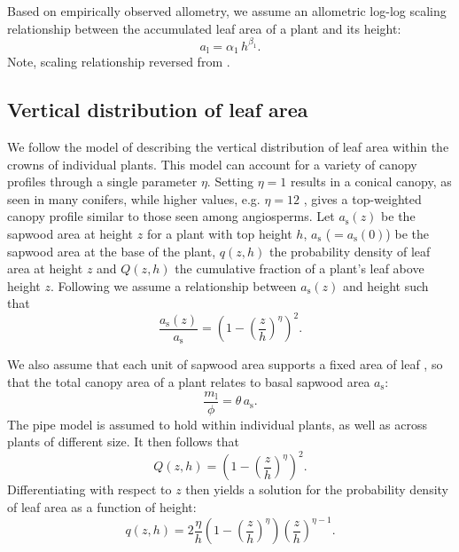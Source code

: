 \documentclass[10pt,twoside]{article}
\begin{document}
Based on empirically observed allometry, we assume an allometric log-log
scaling relationship between the accumulated leaf area of a plant and
its height:
\begin{equation}\label{eq:ha}
a_\textrm{l}=\alpha_1 \, h^{\beta_1}.
\end{equation}
Note, scaling relationship reversed from \citep{Falster-2011}.

\subsection{Vertical distribution of leaf
area}\label{vertical-distribution-of-leaf-area}

We follow the model of \citet{Yokozawa-1995} describing the vertical
distribution of leaf area within the crowns of individual plants. This
model can account for a variety of canopy profiles through a single
parameter \(\eta\). Setting \(\eta=1\) results in a conical canopy, as
seen in many conifers, while higher values, e.g. \(\eta=12\) , gives a
top-weighted canopy profile similar to those seen among angiosperms. Let
\(a_\textrm{s}(z)\) be the sapwood area at height \(z\) for a plant with
top height \(h\), \(a_\textrm{s}\) ($= a_\textrm{s}(0)$) be the sapwood
area at the base of the plant, \(q(z,h)\) the probability density of
leaf area at height \(z\) and \(Q(z,h)\) the cumulative fraction of a
plant's leaf above height \(z\). Following \citet{Yokozawa-1995} we
assume a relationship between \(a_\textrm{s}(z)\) and height such that
\begin{equation}\label{eq:crown1}
\frac{a_\textrm{s}(z)}{a_\textrm{s}}= \left(1-\left(\frac{z}{h}\right)^\eta\right)^2.
\end{equation}

We also assume that each unit of sapwood area supports a fixed area of
leaf \citep[the pipe model][]{Shinozaki-1964}, so that the total canopy
area of a plant relates to basal sapwood area \(a_\textrm{s}\):
\begin{equation}\label{eq:crown2}
\frac{m_\textrm{l}}{\phi}= \theta \, a_\textrm{s}.
\end{equation}
The pipe model is assumed to hold within individual plants, as well as
across plants of different size. It then follows that
\begin{equation}\label{eq:crown1}
Q(z,h)= \left(1-\left(\frac{z}{h}\right)^\eta\right)^2.
\end{equation}
Differentiating with respect to \(z\) then yields a solution for the
probability density of leaf area as a function of height:
\begin{equation}\label{eq:crown3}
q(z,h)= 2\frac{\eta}{h}\left(1-\left(\frac{z}{h}\right)^{\eta}\right) \left(\frac{z}{h}\right)^{\eta-1}.
\end{equation}
\end{document}
